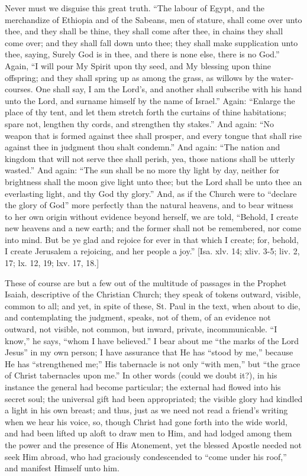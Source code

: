 Never must we disguise this great truth. ``The labour of Egypt,
and the merchandize of Ethiopia and of the Sabeans, men of stature,
shall come over unto thee, and they shall be thine, they shall come
after thee, in chains they shall come over; and they shall fall down
unto thee; they shall make supplication unto thee, saying, Surely God
is in thee, and there is none else, there is no God.'' Again,
``I will pour My Spirit upon thy seed, and My blessing upon thine
offspring; and they shall spring up as among the grass, as willows by
the water-courses. One shall say, I am the Lord's, and another shall
subscribe with his hand unto the Lord, and surname himself by the name
of Israel.'' Again: ``Enlarge the place of thy tent, and let
them stretch forth the curtains of thine habitations; spare not,
lengthen thy cords, and strengthen thy stakes.'' And again:
``No weapon that is formed against thee shall prosper, and every
tongue that shall rise against thee in judgment thou shalt
condemn.'' And again: ``The nation and kingdom that will not
serve thee shall perish, yea, those nations shall be utterly
wasted.'' And again: ``The sun shall be no more thy light by
day, neither for brightness shall the moon give light unto thee; but
the Lord shall be unto thee an everlasting light, and thy God thy
glory.'' And, as if the Church were to ``declare the glory of
God'' more perfectly than the natural heavens, and to bear witness
to her own origin without evidence beyond herself, we are told,
``Behold, I create new heavens and a new earth; and the former
shall not be remembered, nor come into mind. But be ye glad and
rejoice for ever in that which I create; for, behold, I create
Jerusalem a rejoicing, and her people a joy.'' [Isa. xlv. 14; xliv.
3-5; liv. 2, 17; lx. 12, 19; lxv. 17, 18.]

These of course are but a few out of the multitude of passages in
the Prophet Isaiah, descriptive of the Christian Church; they speak of
tokens outward, visible, common to all; and yet, in spite of these,
St. Paul in the text, when about to die, and contemplating the
judgment, speaks, not of them, of an evidence not outward, not
visible, not common, but inward, private, incommunicable. ``I
know,'' he says, ``whom I have believed.'' I bear about me
``the marks of the Lord Jesus'' in my own person; I have
assurance that He has ``stood by me,'' because He has
``strengthened me;'' His tabernacle is not only ``with
men,'' but ``the grace of Christ tabernacles upon me.'' In
other words (could we doubt it?), in his instance the general had
become particular; the external had flowed into his secret soul; the
universal gift had been appropriated; the visible glory had kindled a
light in his own breast; and thus, just as we need not read a friend's
writing when we hear his voice, so, though Christ had gone forth into
the wide world, and had been lifted up aloft to draw men to Him, and
had lodged among them the power and the presence of His Atonement, yet
the blessed Apostle needed not seek Him abroad, who had graciously
condescended to ``come under his roof,'' and manifest Himself
unto him.

